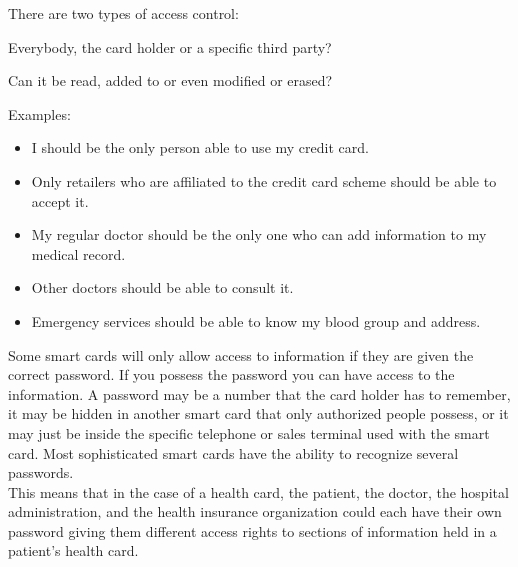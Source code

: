 There are two types of access control:
\begin{htmllist}
  
    Everybody, the card holder or a specific third party?
    
  
    Can it be read, added to or even modified or erased?
\end{htmllist}


\begin{htmllist}

    
    Examples:
    \begin{itemize}
      \item I should be the only person able to use my credit card.
      \item Only retailers who are affiliated to the credit card scheme should
        be able to accept it.
      \item My regular doctor should be the only one who can add information to
        my medical record.
      \item Other doctors should be able to consult it.
      \item Emergency services should be able to know my blood group and
        address.
    \end{itemize}
    
    Some smart cards will only allow access to information if they are
    given the correct password. If you possess the password you can have
    access to the information. A password may be a number that the card
    holder has to remember, it may be hidden in another smart card that
    only authorized people possess, or it may just be inside the specific
    telephone or sales terminal used with the smart card. Most
    sophisticated smart cards have the ability to recognize several
    passwords.\\
    
    This means that in the case of a health card, the patient, the doctor,
    the hospital administration, and the health insurance organization
    could each have their own password giving them different access rights
    to sections of information held in a patient's health card.\\
    


\end{htmllist}
